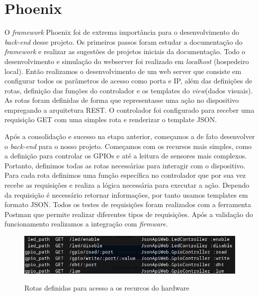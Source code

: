 \documentclass[../../layout.tex]{subfiles}
\begin{document}
\section{Phoenix}
\hspace*{3em}O \emph{framework} Phoenix foi de extrema importância para o desenvolvimento do \emph{back-end} desse projeto. Os primeiros passos foram estudar a documentação do \emph{framework} e realizar as sugestões de projetos iniciais da documentação. Todo o desenvolvimento e simulação do webserver foi realizado em \emph{localhost} (hospedeiro local). Então realizamos o desenvolvimento de um web server que consiste em configurar todos os parâmetros de acesso como porta e IP, além  das definições de rotas, definição das funções do controlador e os templates do \emph{view}(dados visuais). As rotas foram definidas de forma que representasse uma ação no dispositivo  empregando a arquitetura REST. O controlador foi configurado para receber uma requisição GET com uma simples rota e renderizar o template  JSON.\par
Após a consolidação e sucesso na etapa anterior, começamos a de fato desenvolver o \emph{back-end} para o nosso projeto. Começamos com os recursos mais simples, como a definição para controlar os GPIOs e até a leitura de sensores mais complexos. Portanto, definimos todas as rotas necessárias para interagir com o dispositivo. Para cada rota definimos uma função específica no controlador que por sua vez recebe as requisições e realiza a lógica necessária para executar a ação. Dependo da requisição é necessário retornar informações, por tanto usamos templates  em formato JSON.  Todos os testes de requisições foram realizados com a ferramenta Postman que permite realizar diferentes tipos de requisições. Após a validação do funcionamento realizamos a integração com \emph{firmware}.

\begin{figure}[H]
\centering
\caption{Rotas definidas para acesso a os recurcos do hardware}
\includegraphics[width=1\textwidth]{assets/static/img/rotas.jpg}
\label{fig:routes}
\begin{minipage}{0.5\textwidth}
\end{minipage}
\end{figure}
\end{document}
